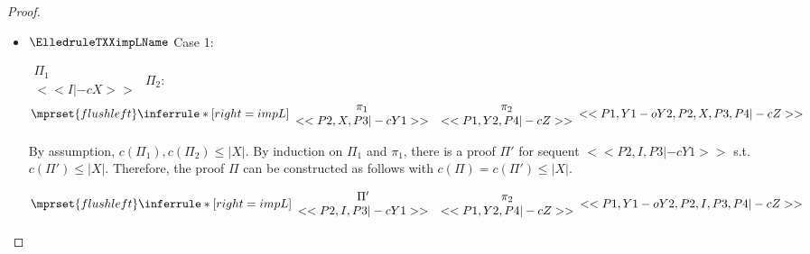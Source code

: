 \begin{proof}
\begin{enumerate}
\begin{itemize}
  \item $\ElledruleTXXimpLName$ Case 1:
      \begin{center}
        \scriptsize
        \begin{math}
          \begin{array}{c}
            \Pi_1 \\
            {<<I |-c X>>}
          \end{array}
        \end{math}
        \qquad\qquad
        $\Pi_2$:
        \begin{math}
          $$\mprset{flushleft}
          \inferrule* [right={\tiny impL}] {
            {
              \begin{array}{cc}
                \pi_1 & \pi_2 \\
                {<<P2, X, P3 |-c Y1>>} & {<<P1, Y2, P4 |-c Z>>}
              \end{array}
            }
          }{<<P1, Y1 -o Y2, P2, X, P3, P4 |-c Z>>}
        \end{math}
      \end{center}
      By assumption, $c(\Pi_1),c(\Pi_2)\leq |X|$. By induction on $\Pi_1$ and $\pi_1$, there is
      a proof $\Pi'$ for sequent $<<P2, I, P3 |-c Y1>>$ s.t. $c(\Pi') \leq |X|$. Therefore, the
      proof $\Pi$ can be constructed as follows with $c(\Pi) = c(\Pi') \leq |X|$.
      \begin{center}
        \scriptsize
        \begin{math}
          $$\mprset{flushleft}
          \inferrule* [right={\tiny impL}] {
            {
              \begin{array}{cc}
                \Pi' & \pi_2 \\
                {<<P2, I, P3 |-c Y1>>} & {<<P1, Y2, P4 |-c Z>>}
              \end{array}
            }
          }{<<P1, Y1 -o Y2, P2, I, P3, P4 |-c Z>>}
        \end{math}
      \end{center}


\end{itemize}
\end{enumerate}
\end{proof}

